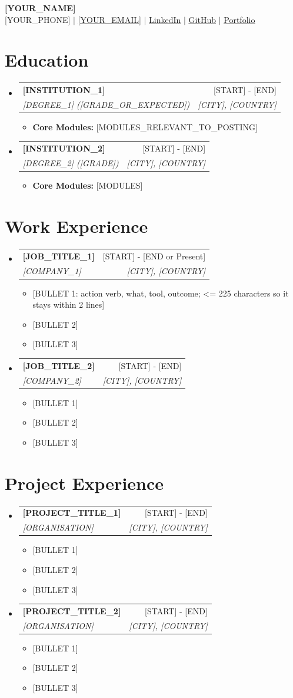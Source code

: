 \documentclass[a4paper,11pt]{article}
\makeatletter
\newlength{\cvgap}\setlength{\cvgap}{0pt}
\newcommand{\resumeItem}[1]{
  \item\small{
    {#1 \vspace{-0.8pt}}
  }
}
\newcommand{\resumeSubheading}[4]{
  \vspace{-2pt}\item
    \begin{tabular*}{0.97\textwidth}[t]{l@{\extracolsep{\fill}}r}
      \textbf{#1} & #2 \\
      \textit{\small#3} & \textit{\small #4} \\
    \end{tabular*}\vspace{-6pt}
}
\newcommand{\resumeSubHeadingListStart}{\begin{itemize}[leftmargin=0.15in, label={}]}
\newcommand{\resumeSubHeadingListEnd}{\end{itemize}}
\newcommand{\resumeItemListStart}{\begin{itemize}}
\newcommand{\resumeItemListEnd}{\end{itemize}\vspace{-3.8pt}}
\makeatother
\begin{document}
\begin{center}
    \textbf{\Huge \scshape [YOUR_NAME]} \\ \vspace{3pt}
    \small [YOUR_PHONE] $|$ \href{mailto:[YOUR_EMAIL]}{\underline{[YOUR_EMAIL]}} $|$
    \href{[YOUR_LINKEDIN_URL]}{\underline{LinkedIn}} $|$
    \href{[YOUR_GITHUB_URL]}{\underline{GitHub}} $|$
    \href{[YOUR_PORTFOLIO_URL]}{\underline{Portfolio}}
\end{center}

\section{\textbf{Education}}
  \resumeSubHeadingListStart
    \resumeSubheading
      {[INSTITUTION_1]}{[START] - [END]}
      {[DEGREE_1] ([GRADE_OR_EXPECTED])}{[CITY], [COUNTRY]}
      \resumeItemListStart
        \resumeItem{\textbf{Core Modules:} [MODULES_RELEVANT_TO_POSTING]}
      \resumeItemListEnd
    \resumeSubheading
      {[INSTITUTION_2]}{[START] - [END]}
      {[DEGREE_2] ([GRADE])}{[CITY], [COUNTRY]}
      \resumeItemListStart
        \resumeItem{\textbf{Core Modules:} [MODULES]}
      \resumeItemListEnd
  \resumeSubHeadingListEnd

\vspace{\cvgap}
\section{\textbf{Work Experience}}
  \resumeSubHeadingListStart
    \resumeSubheading
      {[JOB_TITLE_1]}{[START] - [END or Present]}
      {[COMPANY_1]}{[CITY], [COUNTRY]}
      \resumeItemListStart
        \resumeItem{[BULLET 1: action verb, what, tool, outcome; <= 225 characters so it stays within 2 lines]}
        \resumeItem{[BULLET 2]}
        \resumeItem{[BULLET 3]}
      \resumeItemListEnd
    \resumeSubheading
      {[JOB_TITLE_2]}{[START] - [END]}
      {[COMPANY_2]}{[CITY], [COUNTRY]}
      \resumeItemListStart
        \resumeItem{[BULLET 1]}
        \resumeItem{[BULLET 2]}
        \resumeItem{[BULLET 3]}
      \resumeItemListEnd
  \resumeSubHeadingListEnd

\vspace{\cvgap}
\section{\textbf{Project Experience}}
  \resumeSubHeadingListStart
    \resumeSubheading
      {[PROJECT_TITLE_1]}{[START] - [END]}
      {[ORGANISATION]}{[CITY], [COUNTRY]}
      \resumeItemListStart
        \resumeItem{[BULLET 1]}
        \resumeItem{[BULLET 2]}
        \resumeItem{[BULLET 3]}
      \resumeItemListEnd
    \resumeSubheading
      {[PROJECT_TITLE_2]}{[START] - [END]}
      {[ORGANISATION]}{[CITY], [COUNTRY]}
      \resumeItemListStart
        \resumeItem{[BULLET 1]}
        \resumeItem{[BULLET 2]}
        \resumeItem{[BULLET 3]}
      \resumeItemListEnd
  \resumeSubHeadingListEnd
\end{document}
